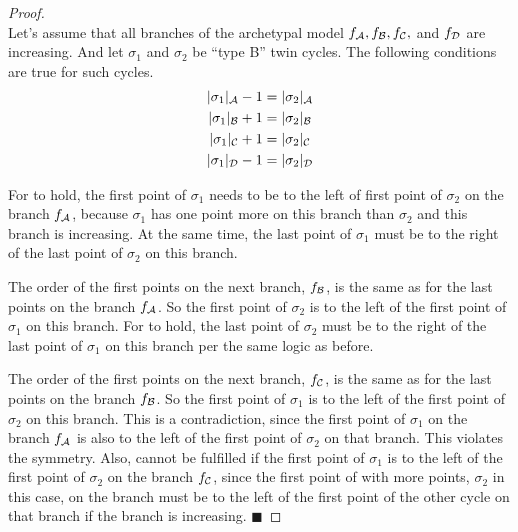 \begin{proof} \phantom{x} \\
	Let's assume that all branches of the archetypal model $f_{\mathcal{A}}, f_{\mathcal{B}}, f_{\mathcal{C}},$ and $f_{\mathcal{D}}$ are increasing.
	And let $\sigma_1$ and $\sigma_2$ be ``type B'' twin cycles.
	The following conditions are true for such cycles.
	\begin{subequations}
		\begin{align}
			|\sigma_1|_{\mathcal{A}} - 1 & = |\sigma_2|_{\mathcal{A}} \label{equ:add.change.conseq.sigmaA} \\
			|\sigma_1|_{\mathcal{B}} + 1 & = |\sigma_2|_{\mathcal{B}} \label{equ:add.change.conseq.sigmaB} \\
			|\sigma_1|_{\mathcal{C}} + 1 & = |\sigma_2|_{\mathcal{C}} \label{equ:add.change.conseq.sigmaC} \\
			|\sigma_1|_{\mathcal{D}} - 1 & = |\sigma_2|_{\mathcal{D}} \label{equ:add.change.conseq.sigmaD}
		\end{align}
	\end{subequations}

	For  to hold, the first point of  $\sigma_1$ needs to be to the left of first point of  $\sigma_2$ on the branch $f_{\mathcal{A}}$, because  $\sigma_1$ has one point more on this branch than  $\sigma_2$ and this branch is increasing.
	At the same time, the last point of  $\sigma_1$ must be to the right of the last point of  $\sigma_2$ on this branch.

	The order of the first points on the next branch, $f_{\mathcal{B}}$, is the same as for the last points on the branch $f_{\mathcal{A}}$.
	So the first point of  $\sigma_2$ is to the left of the first point of  $\sigma_1$ on this branch.
	For  to hold, the last point of  $\sigma_2$ must be to the right of the last point of  $\sigma_1$ on this branch per the same logic as before.

	The order of the first points on the next branch, $f_{\mathcal{C}}$, is the same as for the last points on the branch $f_{\mathcal{B}}$.
	So the first point of  $\sigma_1$ is to the left of the first point of  $\sigma_2$ on this branch.
	This is a contradiction, since the first point of  $\sigma_1$ on the branch $f_{\mathcal{A}}$ is also to the left of the first point of  $\sigma_2$ on that branch.
	This violates the symmetry.
	Also,  cannot be fulfilled if the first point of  $\sigma_1$ is to the left of the first point of  $\sigma_2$ on the branch $f_{\mathcal{C}}$, since the first point of  with more points, $\sigma_2$ in this case, on the branch must be to the left of the first point of the other cycle on that branch if the branch is increasing.
	\hfill $\blacksquare$
\end{proof}
